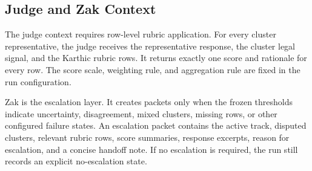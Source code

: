 \subsection{Judge and Zak Context}

The judge context requires row-level rubric application. For every cluster
representative, the judge receives the representative response, the cluster
legal signal, and the Karthic rubric rows. It returns exactly one score and
rationale for every row. The score scale, weighting rule, and aggregation rule
are fixed in the run configuration.

Zak is the escalation layer. It creates packets only when the frozen thresholds
indicate uncertainty, disagreement, mixed clusters, missing rows, or other
configured failure states. An escalation packet contains the active track,
disputed clusters, relevant rubric rows, score summaries, response excerpts,
reason for escalation, and a concise handoff note. If no escalation is required,
the run still records an explicit no-escalation state.
